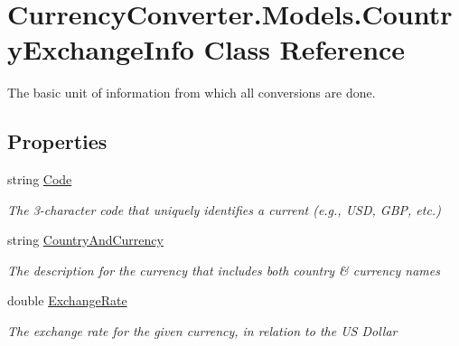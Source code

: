 \hypertarget{class_currency_converter_1_1_models_1_1_country_exchange_info}{\section{Currency\-Converter.\-Models.\-Country\-Exchange\-Info Class Reference}
\label{class_currency_converter_1_1_models_1_1_country_exchange_info}
}


The basic unit of information from which all conversions are done.  


\subsection*{Properties}
\begin{DoxyCompactItemize}
\item 
string \hyperlink{class_currency_converter_1_1_models_1_1_country_exchange_info_a07914fa16f09bfb0343b9008e96a7d33}{Code}
\begin{DoxyCompactList}\small\item\em The 3-\/character code that uniquely identifies a current (e.\-g., U\-S\-D, G\-B\-P, etc.) \end{DoxyCompactList}\item 
string \hyperlink{class_currency_converter_1_1_models_1_1_country_exchange_info_a64106661335ca8646624e98a3d440978}{Country\-And\-Currency}
\begin{DoxyCompactList}\small\item\em The description for the currency that includes both country \& currency names \end{DoxyCompactList}\item 
double \hyperlink{class_currency_converter_1_1_models_1_1_country_exchange_info_a6071faf123a293238228df9d98b0dd64}{Exchange\-Rate}
\begin{DoxyCompactList}\small\item\em The exchange rate for the given currency, in relation to the U\-S Dollar \end{DoxyCompactList}\end{DoxyCompactItemize}


